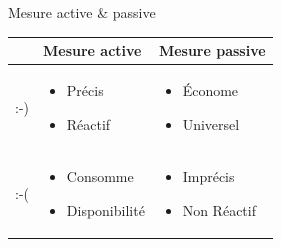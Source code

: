 

\begin{frame}{Mesure active \& passive}
  \begin{tabular}{|p{}|p{}|p{}|}
   \hline
   & Mesure active &  Mesure passive \\
   \hline
   :-) & \begin{itemize}
     \item Précis
     \item Réactif
   \end{itemize} & \begin{itemize}
     \item Économe
     \item Universel
   \end{itemize} \\
   \hline
   :-( & \begin{itemize}
     \item Consomme
     \item Disponibilité
   \end{itemize} & 
   \begin{itemize}
      \item Imprécis
      \item Non Réactif
    \end{itemize} \\
   \hline
\end{tabular}
\end{frame}

